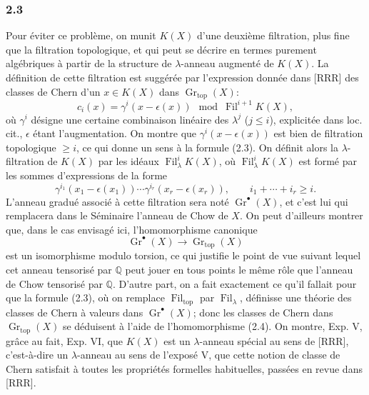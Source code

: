 \documentclass[11pt]{article}
\newcommand{\Gr}{\operatorname{Gr}}
\newcommand{\Fil}{\operatorname{Fil}}
\begin{document}
\subsubsection*{2.3}
Pour éviter ce problème, on munit $K(X)$ d'une deuxième filtration, plus fine que la filtration topologique, et qui peut se décrire en termes purement algébriques à partir de la structure de $\lambda$-anneau augmenté de $K(X)$. La définition de cette filtration est suggérée par l'expression donnée dans [RRR] des classes de Chern d'un $x\in K(X)$ dans $\Gr_{\mathrm{top}}(X)$:
\begin{equation}\tag{2.3}
c_i(x)=\gamma^i(x-\epsilon(x))\mod \Fil^{i+1}K(X),
\end{equation}
où $\gamma^i$ désigne une certaine combinaison linéaire des $\lambda^j$ ($j\le i$), explicitée dans loc. cit., $\epsilon$ étant l'augmentation. On montre que $\gamma^i(x-\epsilon(x))$ est bien de filtration topologique $\ge i$, ce qui donne un sens à la formule (2.3). On définit alors la $\lambda$-filtration de $K(X)$ par les idéaux $\Fil^i_\lambda K(X)$, où $\Fil^i_\lambda K(X)$ est formé par les sommes d'expressions de la forme
\[
\gamma^{i_1}(x_1-\epsilon(x_1))\cdots \gamma^{i_r}(x_r-\epsilon(x_r)),\qquad i_1+\cdots+i_r\ge i.
\]
L'anneau gradué associé à cette filtration sera noté $\Gr^\bullet(X)$, et c'est lui qui remplacera dans le Séminaire l'anneau de Chow de $X$. On peut d'ailleurs montrer que, dans le cas envisagé ici, l'homomorphisme canonique
\begin{equation}\tag{2.4}
\Gr^\bullet(X)\longrightarrow \Gr_{\mathrm{top}}(X)
\end{equation}
est un isomorphisme modulo torsion, ce qui justifie le point de vue suivant lequel cet anneau tensorisé par $\mathbb Q$ peut jouer en tous points le même rôle que l'anneau de Chow tensorisé par $\mathbb Q$. D'autre part, on a fait exactement ce qu'il fallait pour que la formule (2.3), où on remplace $\Fil_{\mathrm{top}}$ par $\Fil_\lambda$, définisse une théorie des classes de Chern à valeurs dans $\Gr^\bullet(X)$; donc les classes de Chern dans $\Gr_{\mathrm{top}}(X)$ se déduisent à l'aide de l'homomorphisme (2.4). On montre, Exp. V, grâce au fait, Exp. VI, que $K(X)$ est un $\lambda$-anneau spécial au sens de [RRR], c'est-à-dire un $\lambda$-anneau au sens de l'exposé V, que cette notion de classe de Chern satisfait à toutes les propriétés formelles habituelles, passées en revue dans [RRR].
\end{document}
